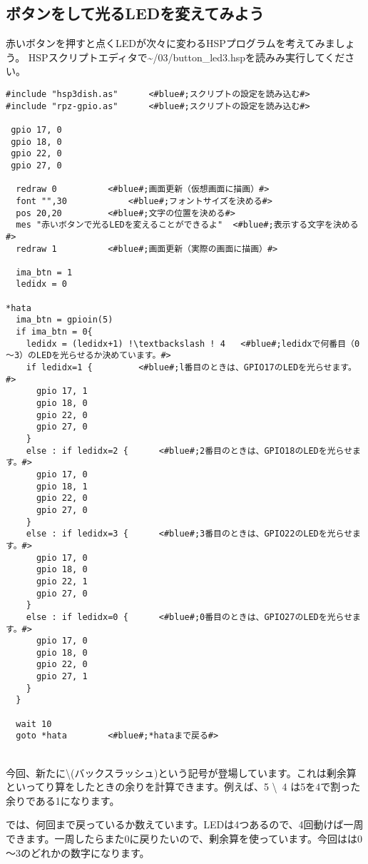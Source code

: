 \subsection{ボタンをして光るLEDを変えてみよう}
赤いボタンを押すと点くLEDが次々に変わるHSPプログラムを考えてみましょう。
HSPスクリプトエディタで\textasciitilde /03/button\_led3.hspを読みみ実行してください。

\begin{lstlisting}[escapechar=!,caption=button\_led3.hsp,label=button_led3.hsp]
#include "hsp3dish.as"		<#blue#;スクリプトの設定を読み込む#>
#include "rpz-gpio.as"		<#blue#;スクリプトの設定を読み込む#>

 gpio 17, 0
 gpio 18, 0
 gpio 22, 0
 gpio 27, 0
	
  redraw 0			<#blue#;画面更新（仮想画面に描画）#>
  font "",30			<#blue#;フォントサイズを決める#>
  pos 20,20			<#blue#;文字の位置を決める#>
  mes "赤いボタンで光るLEDを変えることができるよ"	<#blue#;表示する文字を決める#>
  redraw 1			<#blue#;画面更新（実際の画面に描画）#>

  ima_btn = 1
  ledidx = 0

*hata
  ima_btn = gpioin(5)
  if ima_btn = 0{
    ledidx = (ledidx+1) !\textbackslash ! 4	  <#blue#;ledidxで何番目（0～3）のLEDを光らせるか決めています。#>
    if ledidx=1 {		  <#blue#;l番目のときは、GPIO17のLEDを光らせます。#>
      gpio 17, 1
      gpio 18, 0
      gpio 22, 0
      gpio 27, 0
    }
    else : if ledidx=2 {	  <#blue#;2番目のときは、GPIO18のLEDを光らせます。#>
      gpio 17, 0
      gpio 18, 1
      gpio 22, 0
      gpio 27, 0
    }
    else : if ledidx=3 {	  <#blue#;3番目のときは、GPIO22のLEDを光らせます。#>
      gpio 17, 0
      gpio 18, 0
      gpio 22, 1
      gpio 27, 0
    }
    else : if ledidx=0 {	  <#blue#;0番目のときは、GPIO27のLEDを光らせます。#>
      gpio 17, 0
      gpio 18, 0
      gpio 22, 0
      gpio 27, 1
    }
  }

  wait 10
  goto *hata		<#blue#;*hataまで戻る#>
\end{lstlisting}

\textbf{}\\
今回、新たに\textbackslash (バックスラッシュ)という記号が登場しています。これは剰余算といってり算をしたときの余りを計算できます。例えば、5 \textbackslash \ 4 は5を4で割った余りである1になります。

では、何回まで戻っているか数えています。LEDは4つあるので、4回動けば一周できます。一周したらまた0に戻りたいので、剰余算を使っています。今回はは0～3のどれかの数字になります。\\

